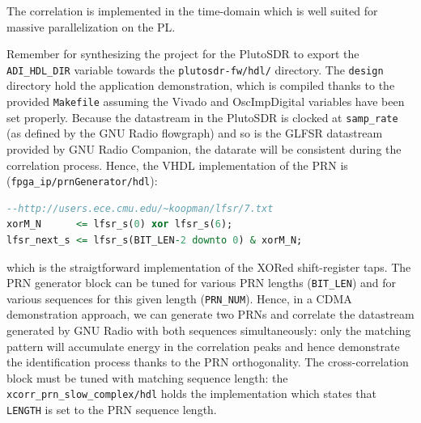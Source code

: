 \documentclass{article}
\begin{document}
The correlation is implemented in the time-domain which is well suited for massive parallelization on
the PL.

Remember for synthesizing the project for the PlutoSDR to export the {\tt ADI\_HDL\_DIR} variable
towards the {\tt plutosdr-fw/hdl/} directory. The {\tt design} directory hold the application
demonstration, which is compiled thanks to the provided {\tt Makefile} assuming the Vivado and
OscImpDigital variables have been set properly. Because the datastream in the PlutoSDR is clocked
at {\tt samp\_rate} (as defined by the GNU Radio flowgraph) and so is the GLFSR datastream
provided by GNU Radio Companion, the datarate will be consistent during the correlation process.
Hence, the VHDL implementation of the PRN is ({\tt fpga\_ip/prnGenerator/hdl}):

\begin{lstlisting}[language=VHDL]
--http://users.ece.cmu.edu/~koopman/lfsr/7.txt
xorM_N      <= lfsr_s(0) xor lfsr_s(6);
lfsr_next_s <= lfsr_s(BIT_LEN-2 downto 0) & xorM_N;
\end{lstlisting}
which is the straigtforward implementation of the XORed shift-register taps. The PRN generator
block can be tuned for various PRN lengths ({\tt BIT\_LEN}) and for various sequences
for this given length ({\tt PRN\_NUM}). Hence, in a CDMA demonstration approach, we can generate
two PRNs and correlate the datastream generated by GNU Radio with both sequences simultaneously:
only the matching pattern will accumulate energy in the correlation peaks and hence demonstrate
the identification process thanks to the PRN orthogonality. The cross-correlation block must
be tuned with matching sequence length: the {\tt xcorr\_prn\_slow\_complex/hdl} holds the 
implementation which states that {\tt LENGTH} is set to the PRN sequence length. 
\end{document}
